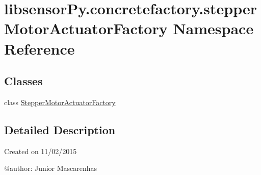 \hypertarget{namespacelibsensorPy_1_1concretefactory_1_1stepperMotorActuatorFactory}{}\section{libsensor\+Py.\+concretefactory.\+stepper\+Motor\+Actuator\+Factory Namespace Reference}
\label{namespacelibsensorPy_1_1concretefactory_1_1stepperMotorActuatorFactory}
\subsection*{Classes}
\begin{DoxyCompactItemize}
\item 
class \hyperlink{classlibsensorPy_1_1concretefactory_1_1stepperMotorActuatorFactory_1_1StepperMotorActuatorFactory}{Stepper\+Motor\+Actuator\+Factory}
\end{DoxyCompactItemize}


\subsection{Detailed Description}
\begin{DoxyVerb}Created on 11/02/2015

@author: Junior Mascarenhas
\end{DoxyVerb}
 